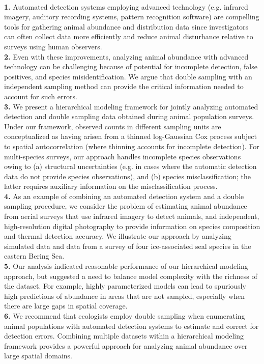 \documentclass[12pt,fleqn]{article}
\begin{document}
\begin{flushleft}
\\
{\bf 1.} Automated detection systems employing advanced technology (e.g. infrared imagery, auditory recording systems, pattern recognition software) are compelling tools for gathering animal abundance and distribution data since investigators can often collect data more efficiently and reduce animal disturbance relative to
surveys using human observers.  \\
{\bf 2.} Even with these improvements, analyzing animal abundance with advanced technology can be challenging because of potential for incomplete detection, false positives, and species misidentification.  We argue that double sampling with an independent sampling method can provide the critical information needed to account for such errors.  \\
{\bf 3.} We present a hierarchical modeling framework for jointly analyzing automated detection and double sampling data obtained during animal population surveys.  Under our framework, observed counts in different sampling units are conceptualized as having arisen from a thinned log-Gaussian Cox process subject to spatial autocorrelation (where thinning accounts for incomplete detection).  For multi-species surveys, our approach handles incomplete species observations owing to (a) structural uncertainties (e.g. in cases where the automatic detection data do not provide species observations), and (b) species misclassification; the latter requires auxiliary information on the misclassification process.\\
{\bf 4.} As an example of combining an automated detection system and a double sampling procedure, we consider the problem of estimating animal abundance from aerial surveys that use infrared imagery to detect animals, and independent, high-resolution digital photography to provide information on species composition and thermal detection accuracy.  We illustrate our approach by analyzing simulated data and data from a survey of four ice-associated seal species in the eastern Bering Sea.\\
{\bf 5.}  Our analysis indicated reasonable performance of our hierarchical modeling approach, but suggested
a need to balance model complexity with the richness of the dataset.  For example, highly parameterized models can lead to spuriously high predictions of abundance in areas that are not sampled, especially when there are large gaps in spatial coverage. \\
{\bf 6.}  We recommend that ecologists employ double sampling when enumerating animal populations with automated detection systems to estimate and correct for detection errors.  Combining multiple datasets within a hierarchical modeling framework provides a powerful approach for analyzing animal abundance over large spatial domains. \\


\end{flushleft}
\end{document}
